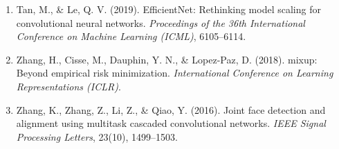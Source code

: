 \documentclass[12pt,a4paper]{article}
\begin{document}
\begin{enumerate}
    \item Tan, M., \& Le, Q. V. (2019). EfficientNet: Rethinking model scaling for convolutional neural networks. \textit{Proceedings of the 36th International Conference on Machine Learning (ICML)}, 6105--6114.
    \item Zhang, H., Cisse, M., Dauphin, Y. N., \& Lopez-Paz, D. (2018). mixup: Beyond empirical risk minimization. \textit{International Conference on Learning Representations (ICLR)}.
    \item Zhang, K., Zhang, Z., Li, Z., \& Qiao, Y. (2016). Joint face detection and alignment using multitask cascaded convolutional networks. \textit{IEEE Signal Processing Letters}, 23(10), 1499--1503.
\end{enumerate}
\end{document}
